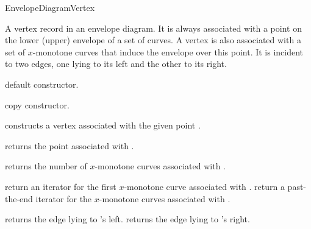 
\ccRefPageBegin

\begin{ccRefConcept}{EnvelopeDiagramVertex}

\ccDefinition

A vertex record in an envelope diagram. It is always associated with a point
on the lower (upper) envelope of a set of curves. A vertex is also
associated with a set of $x$-monotone curves that induce the envelope
over this point. It is incident to two edges, one lying to its
left and the other to its right.

\ccTypes


\ccGlue
{} 

\ccCreation
{}

    {default constructor.}
    
    {copy constructor.}

    {constructs a vertex associated with the given point .}
        
\ccAccessFunctions

    {returns the point associated with \ccVar.}

    {returns the number of $x$-monotone curves associated with \ccVar.}

    {return an iterator for the first $x$-monotone curve associated with \ccVar.}
\ccGlue
{}
    {return a past-the-end iterator for the $x$-monotone curves associated with \ccVar.}

    {returns the edge lying to \ccVar's left.}
\ccGlue
{}
    {returns the edge lying to \ccVar's right.}


\end{ccRefConcept}

